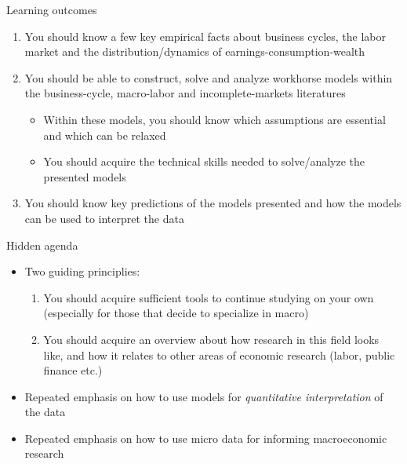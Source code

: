\documentclass[9pt,xcolor={dvipsnames}]{beamer}
\newcommand{\bit}{\begin{itemize}}
\newcommand{\eit}{\end{itemize}}
\newcommand{\ben}{\begin{enumerate}}
\newcommand{\een}{\end{enumerate}}
\begin{document}
\begin{frame}{Learning outcomes}

\ben
\setlength\itemsep{2em}

\item You should know a few key empirical facts about business cycles, the labor market and the distribution/dynamics of earnings-consumption-wealth

\item You should be able to construct, solve and analyze workhorse models within the business-cycle, macro-labor and incomplete-markets literatures
\bit
\setlength\itemsep{0.5em}
\item Within these models, you should know which assumptions are essential and which can be relaxed

\item You should acquire the technical skills needed to solve/analyze the presented models
\eit

\item You should know key predictions of the models presented and how the models can be used to interpret the data

\een

\end{frame}

\begin{frame}{Hidden agenda}

\bit
\setlength\itemsep{2em}

\item Two guiding principlies:
\ben
\setlength\itemsep{0.5em}
	\item You should acquire sufficient tools to continue studying on your own (especially for those that decide to specialize in macro)
	
	\item You should acquire an overview about how research in this field looks like, and how it relates to other areas of economic research (labor, public finance etc.)
\een

\item Repeated emphasis on how to use models for \emph{quantitative interpretation} of the data

\item Repeated emphasis on how to use micro data for informing macroeconomic research


\eit

\end{frame}
\end{document}
